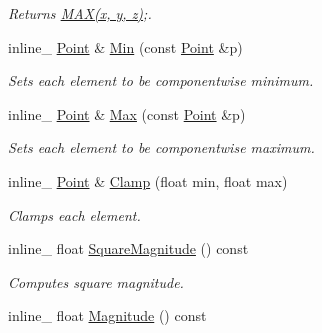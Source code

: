 \begin{DoxyCompactItemize}
\begin{DoxyCompactList}\small\item\em Returns \hyperlink{_ice_types_8h_afa99ec4acc4ecb2dc3c2d05da15d0e3f}{M\+A\+X(x, y, z)};. \end{DoxyCompactList}\item 
\hypertarget{class_point_a893606605537aece9dc35adf1d915c60}{inline\+\_\+ \hyperlink{class_point}{Point} \& \hyperlink{class_point_a893606605537aece9dc35adf1d915c60}{Min} (const \hyperlink{class_point}{Point} \&p)}\label{class_point_a893606605537aece9dc35adf1d915c60}

\begin{DoxyCompactList}\small\item\em Sets each element to be componentwise minimum. \end{DoxyCompactList}\item 
\hypertarget{class_point_a2d35ee239413a2680be0a34927bc18da}{inline\+\_\+ \hyperlink{class_point}{Point} \& \hyperlink{class_point_a2d35ee239413a2680be0a34927bc18da}{Max} (const \hyperlink{class_point}{Point} \&p)}\label{class_point_a2d35ee239413a2680be0a34927bc18da}

\begin{DoxyCompactList}\small\item\em Sets each element to be componentwise maximum. \end{DoxyCompactList}\item 
\hypertarget{class_point_ae8d6791fe6b0aee7493de222b6d81b95}{inline\+\_\+ \hyperlink{class_point}{Point} \& \hyperlink{class_point_ae8d6791fe6b0aee7493de222b6d81b95}{Clamp} (float min, float max)}\label{class_point_ae8d6791fe6b0aee7493de222b6d81b95}

\begin{DoxyCompactList}\small\item\em Clamps each element. \end{DoxyCompactList}\item 
\hypertarget{class_point_a3abb46bdf87fb205b0731eda3ec56fff}{inline\+\_\+ float \hyperlink{class_point_a3abb46bdf87fb205b0731eda3ec56fff}{Square\+Magnitude} () const }\label{class_point_a3abb46bdf87fb205b0731eda3ec56fff}

\begin{DoxyCompactList}\small\item\em Computes square magnitude. \end{DoxyCompactList}\item 
\hypertarget{class_point_aca9186d03219113022d562ff7c7c5ea9}{inline\+\_\+ float \hyperlink{class_point_aca9186d03219113022d562ff7c7c5ea9}{Magnitude} () const }\label{class_point_aca9186d03219113022d562ff7c7c5ea9}


\end{DoxyCompactItemize}
